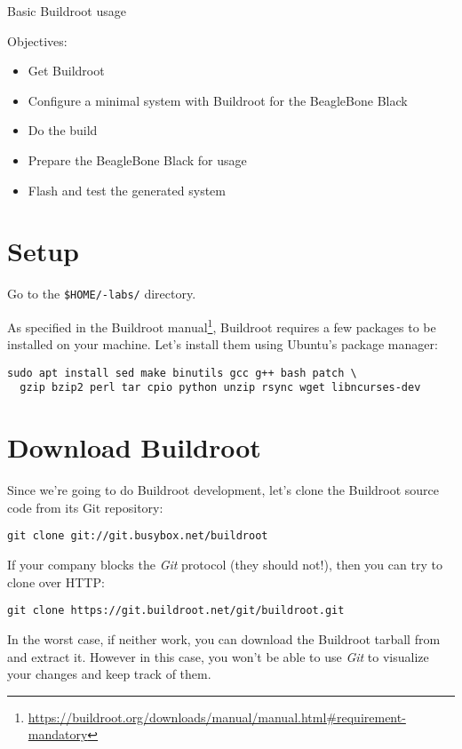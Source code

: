 \subchapter
{Basic Buildroot usage}
{Objectives:
  \begin{itemize}
  \item Get Buildroot
  \item Configure a minimal system with Buildroot for the BeagleBone
    Black
  \item Do the build
  \item Prepare the BeagleBone Black for usage
  \item Flash and test the generated system
  \end{itemize}
}

\section{Setup}

Go to the {\tt \$HOME/\longname-labs/} directory.

As specified in the Buildroot
manual\footnote{\url{https://buildroot.org/downloads/manual/manual.html\#requirement-mandatory}},
Buildroot requires a few packages to be installed on your
machine. Let's install them using Ubuntu's package manager:

\begin{verbatim}
sudo apt install sed make binutils gcc g++ bash patch \
  gzip bzip2 perl tar cpio python unzip rsync wget libncurses-dev
\end{verbatim}

\section{Download Buildroot}

Since we're going to do Buildroot development, let's clone the
Buildroot source code from its Git repository:

\begin{verbatim}
git clone git://git.busybox.net/buildroot
\end{verbatim}

If your company blocks the {\em Git} protocol (they should not!), then
you can try to clone over HTTP:

\begin{verbatim}
git clone https://git.buildroot.net/git/buildroot.git
\end{verbatim}

In the worst case, if neither work, you can download the Buildroot
tarball \code{buildroot-2017.08.tar.bz2} from
 and extract it. However in this
case, you won't be able to use {\em Git} to visualize your changes and
keep track of them.

